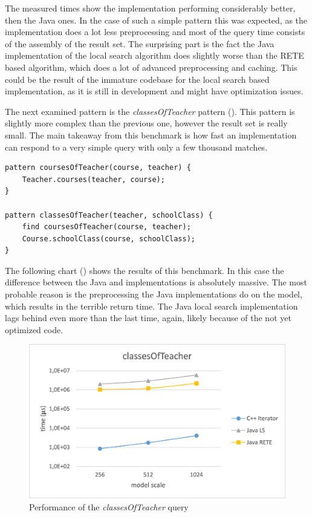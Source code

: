 The measured times show the \CPP{} implementation performing considerably
better, then the Java ones. In the case of such a simple pattern this was
expected, as the \CPP{} implementation does a lot less preprocessing and most of
the query time consists of the assembly of the result set. The surprising part is
the fact the Java implementation of the local search algorithm does slightly
worse than the RETE based algorithm, which does a lot of advanced preprocessing and
caching. This could be the result of the immature codebase for the local search
based implementation, as it is still in development and might have optimization
issues.

The next examined pattern is the \emph{classesOfTeacher} pattern
(). This pattern is slightly more complex than
the previous one, however the result set is really small. The main takeaway from
this benchmark is how fast an implementation can respond to a very simple query
with only a few thousand matches.

\begin{lstlisting}[frame=single,float=!ht,language=IQPL,
label=listing:meas_classesOfTeacher, caption=The classesOfTeacher pattern]
pattern coursesOfTeacher(course, teacher) {
	Teacher.courses(teacher, course);
}

pattern classesOfTeacher(teacher, schoolClass) {
	find coursesOfTeacher(course, teacher);
	Course.schoolClass(course, schoolClass);
}
\end{lstlisting}

The following chart () shows the results of this
benchmark. In this case the difference between the Java and \CPP{}
implementations is absolutely massive. The most probable reason is the
preprocessing the Java implementations do on the model, which results in the
terrible return time. The Java local search implementation lags behind even more
than the last time, again, likely because of the not yet optimized code.

\begin{figure}[!ht]
\centering
\includegraphics[width=120mm,
keepaspectratio]{figures/meas_classesOfTeacher.png}
\caption{Performance of the \emph{classesOfTeacher} query}
\label{fig:meas_classesOfTeacher}
\end{figure}


